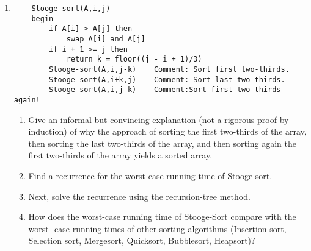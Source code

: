 \documentclass[a4paper,12pt]{article}
\begin{document}
\begin{enumerate}
\item
\begin{verbatim}
    Stooge-sort(A,i,j)
    begin
        if A[i] > A[j] then
            swap A[i] and A[j]
        if i + 1 >= j then
            return k = floor((j - i + 1)/3)
        Stooge-sort(A,i,j-k)    Comment: Sort first two-thirds.
        Stooge-sort(A,i+k,j)    Comment: Sort last two-thirds.
        Stooge-sort(A,i,j-k)    Comment:Sort first two-thirds again!
\end{verbatim}
\begin{enumerate}
    \item Give an informal but convincing explanation (not a rigorous proof by induction) of why the approach of sorting the first two-thirds of the array, then sorting the last two-thirds of the array, and then sorting again the first two-thirds of the array yields a sorted array.
    \item Find a recurrence for the worst-case running time of Stooge-sort.
    \item Next, solve the recurrence using the recursion-tree method. 
    \item How does the worst-case running time of Stooge-Sort compare with the worst- case running times of other sorting algorithms (Insertion sort, Selection sort, Mergesort, Quicksort, Bubblesort, Heapsort)?



\end{enumerate}

\end{enumerate}
\end{document}
